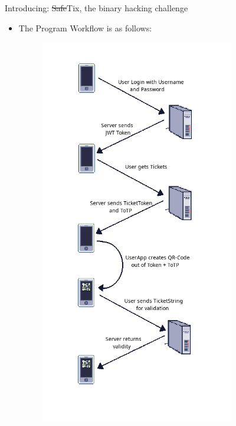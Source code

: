 \documentclass[final,dvipsnames]{beamer}
\newlength{\colwidth}
\begin{document}
\begin{frame}[t, fragile]
\begin{columns}[t]
\begin{column}{\colwidth}
\begin{block}{Introducing: \sout{Safe}Tix, the binary hacking challenge}
\begin{itemize}
            \textbf{Client:}
            \begin{itemize}
                \item Written in C++ with \textbf{Qt} for displaying QR codes in a Window.
                \item Tickets consist of a \textbf{token} and a \textbf{TOTP-generated OTP}.
                \item Connects to the server via HTTPS to fetch and validate tickets.
                \item Updates QR codes every 15 seconds.
            \end{itemize}
            \item The Program Workflow is as follows:
            \begin{figure}[h]
				\centering
				\includegraphics[width=0.8\textwidth]{figures/Workflow_v2.png}

\end{figure}
\end{itemize}
\end{block}
\end{column}
\end{columns}
\end{frame}
\end{document}

